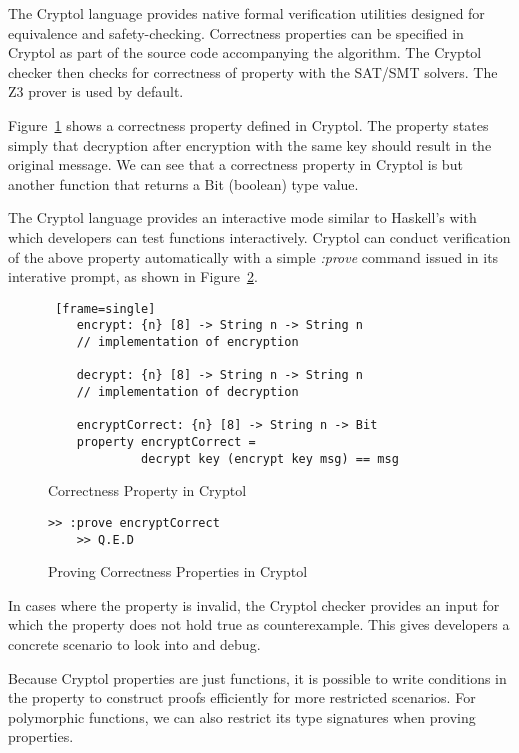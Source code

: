 \documentclass[a4paper, notitlepage]{report}
\begin{document}
The Cryptol language provides native formal verification utilities designed for
equivalence and safety-checking. Correctness properties can be specified in Cryptol
as part of the source code accompanying the algorithm. The Cryptol checker then
checks for correctness of property with the SAT/SMT solvers. The Z3 prover is used
by default.

Figure~\ref{fig:property} shows a correctness property defined in Cryptol. The
property states simply that decryption after encryption with the same key should
result in the original message. We can see that a correctness property in Cryptol
is but another function that returns a Bit (boolean) type value.

The Cryptol language provides an interactive mode similar to Haskell's with which
developers can test functions interactively.
Cryptol can conduct verification of the above property automatically with a simple
\emph{:prove} command issued in its interative prompt, as shown in Figure~\ref{fig:prove}.

\begin{figure}
  \begin{lstlisting} [frame=single]
    encrypt: {n} [8] -> String n -> String n
    // implementation of encryption
    
    decrypt: {n} [8] -> String n -> String n
    // implementation of decryption

    encryptCorrect: {n} [8] -> String n -> Bit
    property encryptCorrect =
             decrypt key (encrypt key msg) == msg 
  \end{lstlisting}
  
  \caption{Correctness Property in Cryptol}
  \label{fig:property}
\end{figure}

\begin{figure}
  \begin{lstlisting}[frame=single]
    >> :prove encryptCorrect
    >> Q.E.D
  \end{lstlisting}
  \caption{Proving Correctness Properties in Cryptol}
  \label{fig:prove}
\end{figure}

In cases where the property is invalid, the Cryptol checker provides an input
for which the property does not hold true as counterexample. This gives developers
a concrete scenario to look into and debug.

Because Cryptol properties are just functions, it is possible to write conditions
in the property to construct proofs efficiently for more restricted scenarios.
For polymorphic functions, we can also restrict its type signatures when
proving properties.
\end{document}
